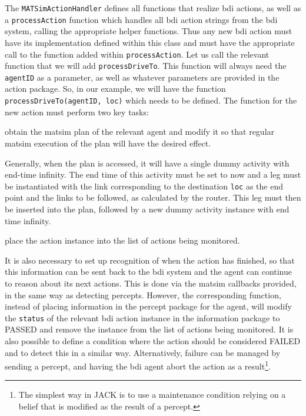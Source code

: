 The \lstinline{MATSimActionHandler} defines all functions that
realize \gls{bdi} actions, as well as a \lstinline{processAction} function
which handles all \gls{bdi} action strings from the \gls{bdi} system,
calling the appropriate helper functions. Thus any new \gls{bdi} action must have
its implementation defined within this class and must have the appropriate
call to the function added within \lstinline{processAction}.  Let us call
the relevant function that we will add \lstinline{processDriveTo}. This function
will always need the \lstinline{agentID} as a parameter, as well as
whatever parameters are provided in the action package. So, in our
example, we will have the function \lstinline{processDriveTo(agentID, loc)}
which needs to be defined. 
%
The function for the new action must perform two key tasks:
\begin{tightenumerate}
\item obtain the \gls{matsim} plan of the relevant agent and modify it so
  that regular \gls{matsim} execution of the plan will have the desired
  effect.

Generally, when the plan is accessed, it will have a single dummy
activity with end-time infinity. The end time of this activity must be
set to now and a leg must be instantiated with the link corresponding
to the destination \lstinline{loc} as the end point and the links to be
followed, as calculated by the router. This leg must then be inserted
into the plan, followed by a new dummy activity instance with end time
infinity. 

\item place the action instance into the list of actions being
  monitored. 
\end{tightenumerate}

It is also necessary to set up recognition of when the action has
finished, so that this information can be sent back to the \gls{bdi} system
and the agent can continue to reason about its next actions.  This is
done via the \gls{matsim} callbacks provided, in the same way as 
detecting percepts. However, the corresponding function, instead of
placing information in the percept package for the agent, will modify
the \lstinline{status} of the relevant \gls{bdi} action instance in the
information package to PASSED and remove the instance from the list
of actions being monitored. It is also possible to define a condition
where the action should be considered FAILED
and to detect this in a similar way. Alternatively, failure can be
managed by sending a percept, and having the \gls{bdi} agent abort the
action as a result\footnote{The simplest way in JACK is to use a
  maintenance condition relying on a belief that is modified 
as the result of a percept.}.

